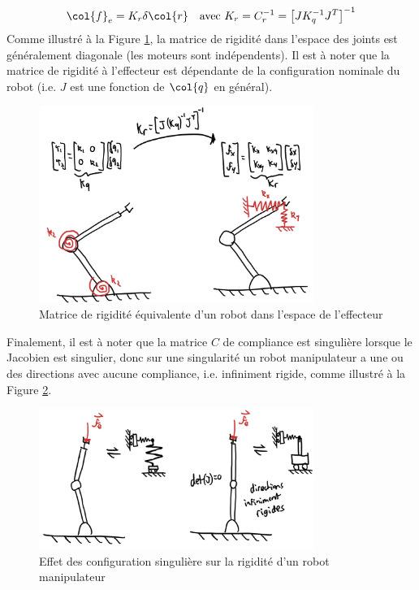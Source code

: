 \begin{align}
\col{f}_e = K_r \delta \col{r} \quad \text{avec } K_r = C_r^{-1} = \left[ J K_q^{-1} J^T \right]^{-1}
\end{align}
Comme illustré à la Figure \ref{fig:robotcompliance_effector}, la matrice de rigidité dans l'espace des joints est généralement diagonale (les moteurs sont indépendents). Il est à noter que la matrice de rigidité à l'effecteur est dépendante de la configuration nominale du robot (i.e. $J$ est une fonction de $\col{q}$ en général).
\begin{figure}[htbp]
	\centering
		\includegraphics[width=0.80\textwidth]{fig/robotcompliance_effector.jpg}
	\caption{Matrice de rigidité équivalente d'un robot dans l'espace de l'effecteur}
	\label{fig:robotcompliance_effector}
\end{figure}
%
Finalement, il est à noter que la matrice $C$ de compliance est singulière lorsque le Jacobien est singulier, donc sur une singularité un robot manipulateur a une ou des directions avec aucune compliance, i.e. infiniment rigide, comme illustré à la Figure \ref{fig:robotcompliance_singular}.
\begin{figure}[htbp]
	\centering
		\includegraphics[width=0.80\textwidth]{fig/robotcompliance_singular.jpg}
	\caption{Effet des configuration singulière sur la rigidité d'un robot manipulateur}
	\label{fig:robotcompliance_singular}
\end{figure}

